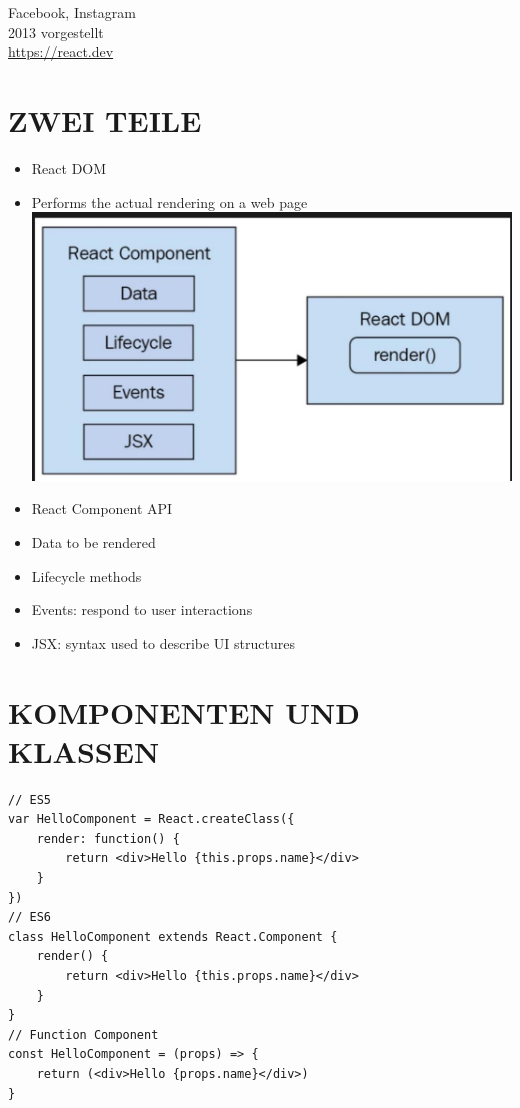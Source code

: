 Facebook, Instagram\\
2013 vorgestellt\\
\href{https://react.dev}{https://react.dev}

\section*{ZWEI TEILE}
\begin{itemize}
  \item React DOM
  \item Performs the actual rendering on a web page\\
\includegraphics[width=\linewidth]{images/2025_01_02_68113d8fd21152cab1dbg-06}
  \item React Component API
  \item Data to be rendered
  \item Lifecycle methods
  \item Events: respond to user interactions
  \item JSX: syntax used to describe UI structures
\end{itemize}

\section*{KOMPONENTEN UND KLASSEN}
\begin{verbatim}
// ES5
var HelloComponent = React.createClass({
    render: function() {
        return <div>Hello {this.props.name}</div>
    }
})
// ES6
class HelloComponent extends React.Component {
    render() {
        return <div>Hello {this.props.name}</div>
    }
}
// Function Component
const HelloComponent = (props) => {
    return (<div>Hello {props.name}</div>)
}
\end{verbatim}

